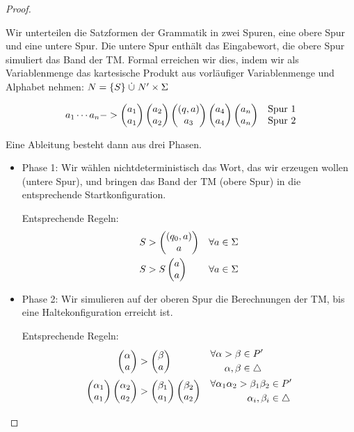 \begin{proof}
\begin{itemize}
\begin{itemize}
	Wir unterteilen die Satzformen der Grammatik in zwei Spuren, eine obere Spur und eine untere Spur.
	Die untere Spur enthält das Eingabewort, die obere Spur simuliert das Band der \ac{TM}.
	Formal erreichen wir dies, indem wir als Variablenmenge das kartesische Produkt aus vorläufiger Variablenmenge und Alphabet nehmen:
	$N = \{S\}\mathrel{\dot\cup} N' \times\Sigma$
	
		\begin{align*}
		a_1\cdots a_n &\-->
			\pmqty{a_1\\a_1} \pmqty{a_2\\a_2} \pmqty{(q,a)\\a_3} \pmqty{a_4\\a_4} \pmqty{a_n\\a_n}
			&&\begin{matrix}\text{Spur 1}\\\text{Spur 2}\end{matrix}\\
	\end{align*}
	
	Eine Ableitung besteht dann aus drei Phasen.
	\begin{itemize}
	\item Phase 1: 
	Wir wählen nichtdeterministisch das Wort, das wir erzeugen wollen (untere Spur), und bringen das Band der \ac{TM} (obere Spur) in die entsprechende Startkonfiguration.
	
	Entsprechende Regeln:
		\begin{align*}
		S &\-> \pmqty{(q_0,a)\\a} &&\forall a\in\Sigma\\
		S &\-> S\pmqty{a\\a} &&\forall a\in\Sigma
        \end{align*}
	
	\item Phase 2:
	Wir simulieren auf der oberen Spur die Berechnungen der \ac{TM}, bis eine Haltekonfiguration erreicht ist.
	
	Entsprechende Regeln:
	\begin{align*}
		\pmqty{\alpha\\a}
			&\-> \pmqty{\beta\\a}
			&&\begin{aligned}
				\forall \alpha\->\beta &\in P'\\
				\alpha,\beta &\in\triangle
			\end{aligned}\\
		\pmqty{\alpha_1\\a_1}\pmqty{\alpha_2\\a_2}
			&\-> \pmqty{\beta_1\\a_1}\pmqty{\beta_2\\a_2}
			&&\begin{aligned}
				\forall \alpha_1\alpha_2\->\beta_1\beta_2 &\in P'\\
				\alpha_i,\beta_i &\in\triangle
			\end{aligned}
	\end{align*}
	

\end{itemize}
\end{itemize}
\end{itemize}
\end{proof}
